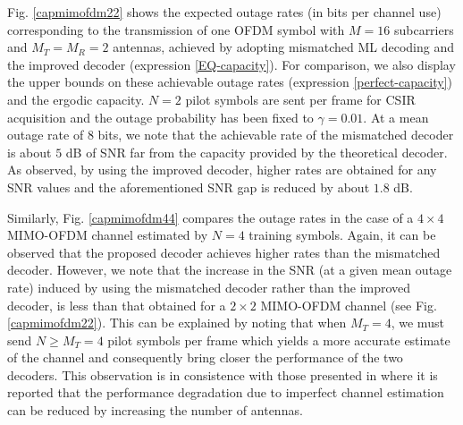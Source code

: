 \documentclass{article}
\begin{document}
Fig. \ref{capmimofdm22} shows the expected outage rates (in bits per channel use) corresponding to the transmission of one OFDM symbol with $M=16$ subcarriers and $M_T=M_R=2$ antennas, achieved by adopting mismatched ML decoding and the improved decoder (expression \eqref{EQ-capacity}). For comparison, we also display the upper bounds on these achievable outage rates (expression \eqref{perfect-capacity}) and the ergodic capacity.
$N=2$ pilot symbols are sent per frame for CSIR acquisition and the outage probability has been fixed to $\gamma=0.01$. At a mean outage rate of $8$ bits, we note that the achievable rate of the mismatched decoder is about $5$ dB of SNR far from the capacity provided by the theoretical decoder. As observed, by using the improved decoder, higher rates are obtained for any SNR values and the aforementioned SNR gap is reduced by about $1.8$ dB.

Similarly, Fig. \ref{capmimofdm44} compares the outage rates in the case of a $4\times4$ MIMO-OFDM channel estimated by $N=4$ training symbols. Again, it can be observed that the proposed decoder achieves higher rates than the mismatched decoder. However, we note that the increase in the SNR (at a given mean outage rate) induced by using the mismatched decoder rather than the improved decoder, is less than that obtained for a $2\times2$ MIMO-OFDM channel (see Fig. \ref{capmimofdm22}). This can be explained by noting that when $M_T=4$, we must send $N \geq M_T=4$ pilot symbols per frame which yields a more accurate estimate of the channel and consequently bring closer the performance of the two decoders. This observation is in consistence with those presented in \cite{garg05} where it is reported that the performance degradation due to imperfect channel estimation can be reduced by increasing the number of antennas.
\vspace{-1.5mm}
\end{document}
